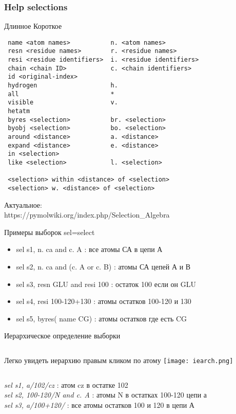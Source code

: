 			 \begin{frame}[fragile]
				 \frametitle{Help selections}
{\tiny
	\hspace{0.5cm}	Длинное \hspace{2cm}Короткое
\begin{verbatim}
 name <atom names>           n. <atom names>
 resn <residue names>        r. <residue names>
 resi <residue identifiers>  i. <residue identifiers>
 chain <chain ID>            c. <chain identifiers>
 id <original-index>
 hydrogen                    h.
 all                         *
 visible                     v.
 hetatm
 byres <selection>           br. <selection>
 byobj <selection>           bo. <selection>
 around <distance>           a. <distance>
 expand <distance>           e. <distance>
 in <selection>
 like <selection>            l. <selection>

 <selection> within <distance> of <selection>
 <selection> w. <distance> of <selection> 
\end{verbatim}
}

Актуальное:\\
https://pymolwiki.org/index.php/Selection\_Algebra

\end{frame}

 \begin{frame}{Примеры выборок}
sel=select
    \begin{itemize}
   \item sel s1, n. ca and c. A : все атомы СА в цепи А
   \item sel s2, n. ca and (c. A or c. B) : атомы СА цепей А и В
   \item sel s3, resn GLU and resi 100 : остаток 100 если он GLU
   \item sel s4, resi 100-120+130 : атомы остатков 100-120 и 130
   \item sel s5, byres( name CG) : атомы остатков где есть CG
    \end{itemize}
\end{frame}

\begin{frame}{Иерархическое определение выборки}
		\begin{columns}
		Легко увидеть иерархию правым кликом по атому
		\texttt{[image: iearch.png]}
		\end{columns}
		\textit{sel s1, a/102/cz}  : атом cz в остатке 102 \\
		\textit{sel s2, 100-120/N and c. A} : атомы N  в остатках 100-120 цепи а\\
		\textit{sel s3, a/100+120/} : все атомы остатков 100 и 120 в цепи А\\
\end{frame}

